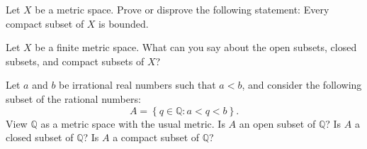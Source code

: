 \documentclass[12pt,letterpaper,boxed,cm]{hmcpset}
\newcommand{\set}[1]{\left\{#1\right\}}
\newcommand{\Q}[0]{\mathbb{Q}}
\begin{document}

\begin{problem}[1)]
    Let $X$ be a metric space. Prove or disprove the following statement: Every compact subset of $X$ is bounded.
\end{problem}

\begin{solution}
    \vfill
\end{solution}
\newpage

\begin{problem}[2)]
    Let $X$ be a finite metric space. What can you say about the open subsets, closed subsets, and compact subsets of $X$?
\end{problem}

\begin{solution}
    \vfill
\end{solution}
\newpage

\begin{problem}[3)]
    Let $a$ and $b$ be irrational real numbers such that $a < b$, and consider the following subset of the rational numbers:
    \[
        A = \set{q \in \Q : a < q < b}.
    \]
    View $\Q$ as a metric space with the usual metric. Is $A$ an open subset of $\Q$? Is $A$ a closed subset of $\Q$? Is $A$ a compact subset of $\Q$?
\end{problem}

\begin{solution}
    \vfill
\end{solution}
\end{document}
